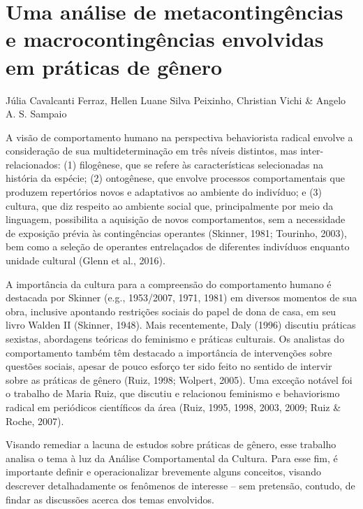 \chapter{Uma análise de metacontingências e macrocontingências envolvidas em práticas de gênero}
\begin{flushright}
\begin{scriptsize}
    Júlia Cavalcanti Ferraz, Hellen Luane Silva Peixinho, Christian Vichi \& Angelo A. S. Sampaio    
\end{scriptsize}
\vspace{1cm}
\end{flushright}

A visão de comportamento humano na perspectiva behaviorista radical envolve a consideração de sua multideterminação em três níveis distintos, mas inter-relacionados: (1) filogênese, que se refere às características selecionadas na história da espécie; (2) ontogênese, que envolve processos comportamentais que produzem repertórios novos e adaptativos ao ambiente do indivíduo; e (3) cultura, que diz respeito ao ambiente social que, principalmente por meio da linguagem, possibilita a aquisição de novos comportamentos, sem a necessidade de exposição prévia às contingências operantes (Skinner, 1981; Tourinho, 2003), bem como a seleção de operantes entrelaçados de diferentes indivíduos enquanto unidade cultural (Glenn et al., 2016).

A importância da cultura para a compreensão do comportamento humano é destacada por Skinner (e.g., 1953/2007, 1971, 1981) em diversos momentos de sua obra, inclusive apontando restrições sociais do papel de dona de casa, em seu livro Walden II (Skinner, 1948). Mais recentemente, Daly (1996) discutiu práticas sexistas, abordagens teóricas do feminismo e práticas culturais. Os analistas do comportamento também têm destacado a importância de intervenções sobre questões sociais, apesar de pouco esforço ter sido feito no sentido de intervir sobre as práticas de gênero (Ruiz, 1998; Wolpert, 2005). Uma exceção notável foi o trabalho de Maria Ruiz, que discutiu e relacionou feminismo e behaviorismo radical em periódicos científicos da área (Ruiz, 1995, 1998, 2003, 2009; Ruiz \& Roche, 2007).

Visando remediar a lacuna de estudos sobre práticas de gênero, esse trabalho analisa o tema à luz da Análise Comportamental da Cultura. Para esse fim, é importante definir e operacionalizar brevemente alguns conceitos, visando descrever detalhadamente os fenômenos de interesse – sem pretensão, contudo, de findar as discussões acerca dos temas envolvidos.

